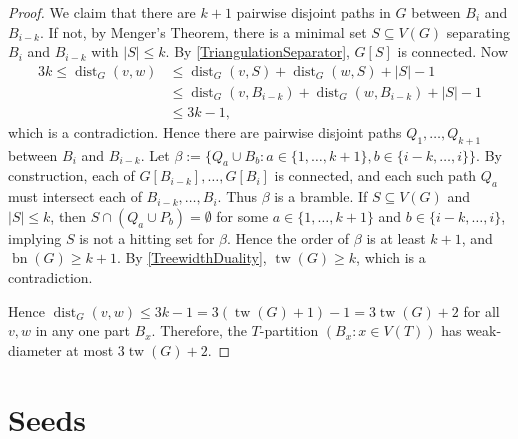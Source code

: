 \documentclass[11pt]{article}
\renewcommand{\geq}{\geqslant}
\renewcommand{\leq}{\leqslant}
\DeclareMathOperator{\dist}{dist}
\DeclareMathOperator{\bn}{bn}
\DeclareMathOperator{\tw}{tw}
\theoremstyle{plain}
\newtheorem{lem}[thm]{Lemma}
\theoremstyle{definition}
\begin{document}
\begin{proof}
			We claim that there are $k+1$ pairwise disjoint paths in $G$ between $B_i$ and $B_{i-k}$. If not, by Menger's Theorem, there is a minimal set $S\subseteq V(G)$ separating $B_i$ and $B_{i-k}$ with $|S|\leq k$. By \cref{TriangulationSeparator}, $G[S]$ is connected. Now 
			\begin{align*}
				3k\leq \dist_G(v,w)
				& \leq \dist_G(v,S)+\dist_G(w,S)+|S|-1 \\
				& \leq
				\dist_G(v,B_{i-k})+\dist_G(w,B_{i-k})+|S|-1 \\
				& \leq 3k-1,
			\end{align*}
			which is a contradiction. Hence there are pairwise disjoint paths $Q_1,\dots,Q_{k+1}$ between $B_i$ and $B_{i-k}$. 
			Let $\beta:= \{Q_a\cup B_b: a\in\{1,\dots,k+1\}, b\in\{i-k,\dots,i\}\}$. 
			By construction, each of $G[B_{i-k}],\dots,G[B_i]$ is connected, and each such path $Q_a$ must intersect each of $B_{i-k},\dots,B_i$. Thus $\beta$ is a bramble. 
			If $S\subseteq V(G)$ and $|S|\leq k$, then $S\cap (Q_a\cup P_b)=\emptyset$ for some $a\in\{1,\dots,k+1\}$ and $b\in\{i-k,\dots,i\}$, implying $S$ is not a hitting set for $\beta$. Hence the order of $\beta$ is at least $k+1$, and $\bn(G)\geq k+1$. By \cref{TreewidthDuality}, $\tw(G)\geq k$, which is a contradiction.
			
			Hence
			$\dist_G(v,w)\leq 3k-1=3(\tw(G)+1)-1=3\tw(G)+2$ for all $v,w$ in any one part $B_x$. Therefore, the $T$-partition $(B_x:x\in V(T))$ has weak-diameter at most $3\tw(G)+2$. 
		\end{proof}
			
		
		
		\section{Seeds}
		\label{sec:FindingSeeds}
		
\end{document}
